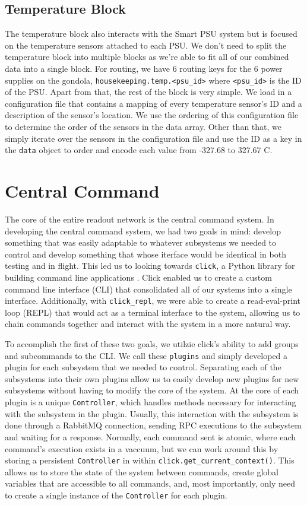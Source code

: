 \subsection{Temperature Block}
The temperature block also interacts with the Smart PSU system but is focused on the temperature sensors attached to each PSU.
We don't need to split the temperature block into multiple blocks as we're able to fit all of our combined data into a single block.
For routing, we have 6 routing keys for the 6 power supplies on the gondola, \texttt{housekeeping.temp.<psu\_id>} where \texttt{<psu\_id>} is the ID of the PSU.
Apart from that, the rest of the block is very simple. 
We load in a configuration file that contains a mapping of every temperature sensor's ID and a description of the sensor's location. 
We use the ordering of this configuration file to determine the order of the sensors in the data array.
Other than that, we simply iterate over the sensors in the configuration file and use the ID as a key in the \texttt{data} object to order and encode each value from -327.68 to 327.67 C.

\section{Central Command}
The core of the entire readout network is the central command system.
In developing the central command system, we had two goals in mind: develop something that was easily adaptable to whatever subsystems we needed to control and develop something that whose iterface would be identical in both testing and in flight.
This led us to looking towards \texttt{click}, a Python library for building command line applications \citep{click}.
Click enabled us to create a custom command line interface (CLI) that consolidated all of our systems into a single interface.
Additionally, with \texttt{click\_repl}, we were able to create a read-eval-print loop (REPL) that would act as a terminal interface to the system, allowing us to chain commands together and interact with the system in a more natural way.

To accomplish the first of these two goals, we utilzie click's ability to add groups and subcommands to the CLI.
We call these \texttt{plugins} and simply developed a plugin for each subsystem that we needed to control. 
Separating each of the subsystems into their own plugins allow us to easily develop new plugins for new subsystems without having to modify the core of the system.
At the core of each plugin is a unique \texttt{Controller}, which handles methods necessary for interacting with the subsystem in the plugin.
Usually, this interaction with the subsystem is done through a RabbitMQ connection, sending RPC executions to the subsystem and waiting for a response.
Normally, each command sent is atomic, where each command's execution exists in a vaccuum, but we can work around this by storing a persistent \texttt{Controller} in within \texttt{click.get\_current\_context()}. 
This allows us to store the state of the system between commands, create global variables that are accessible to all commands, and, most importantly, only need to create a single instance of the \texttt{Controller} for each plugin.

